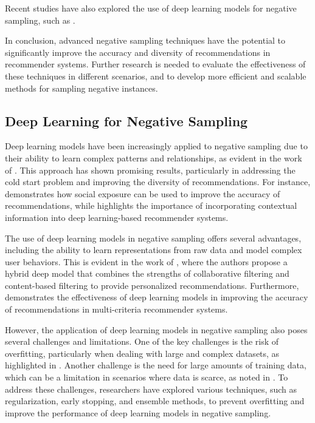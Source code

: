 \documentclass[11pt,a4paper]{article}
\begin{document}
Recent studies have also explored the use of deep learning models for negative sampling, such as \cite{doi:10.1155/2022/9593957}. 

In conclusion, advanced negative sampling techniques have the potential to significantly improve the accuracy and diversity of recommendations in recommender systems. Further research is needed to evaluate the effectiveness of these techniques in different scenarios, and to develop more efficient and scalable methods for sampling negative instances.


\subsection{Deep Learning for Negative Sampling}


Deep learning models have been increasingly applied to negative sampling due to their ability to learn complex patterns and relationships, as evident in the work of \cite{doi:10.1109/access.2019.2905534}. This approach has shown promising results, particularly in addressing the cold start problem and improving the diversity of recommendations. For instance, \cite{doi:10.1609/aaai.v32i1.11835} demonstrates how social exposure can be used to improve the accuracy of recommendations, while \cite{doi:10.1109/access.2020.2975167} highlights the importance of incorporating contextual information into deep learning-based recommender systems.

The use of deep learning models in negative sampling offers several advantages, including the ability to learn representations from raw data and model complex user behaviors. This is evident in the work of \cite{doi:10.24963/ijcai.2017/446}, where the authors propose a hybrid deep model that combines the strengths of collaborative filtering and content-based filtering to provide personalized recommendations. Furthermore, \cite{doi:10.1145/3611310} demonstrates the effectiveness of deep learning models in improving the accuracy of recommendations in multi-criteria recommender systems.

However, the application of deep learning models in negative sampling also poses several challenges and limitations. One of the key challenges is the risk of overfitting, particularly when dealing with large and complex datasets, as highlighted in \cite{doi:10.1145/3097983.3098202}. Another challenge is the need for large amounts of training data, which can be a limitation in scenarios where data is scarce, as noted in \cite{doi:10.3390/app9091894}. To address these challenges, researchers have explored various techniques, such as regularization, early stopping, and ensemble methods, to prevent overfitting and improve the performance of deep learning models in negative sampling.
\end{document}
